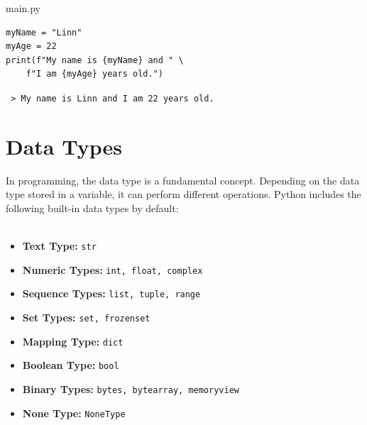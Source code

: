 \documentclass{report}
\begin{document}
\begin{vscode}{main.py}
\begin{lstlisting}[style=vscodeStyle]
myName = "Linn"
myAge = 22
print(f"My name is {myName} and " \
    f"I am {myAge} years old.")
\end{lstlisting}
\end{vscode}

\begin{terminal}
\texttt{\color{terminalFont} > My name is Linn and I am 22 years old.}\\
\end{terminal}

\section{Data Types}
In programming, the data type is a fundamental concept. Depending on the data type stored in a variable, it can perform different operations. Python includes the following built-in data types by default:
\\\\

\begin{tcolorbox}[colback=blue!5!white,colframe=blue!75!black, title=\textbf{Built-in Data Types}]
\begin{itemize}
    \item \textbf{Text Type:} \texttt{str}
    \item \textbf{Numeric Types:} \texttt{int, float, complex}
    \item \textbf{Sequence Types:} \texttt{list, tuple, range}
    \item \textbf{Set Types:} \texttt{set, frozenset}
    \item \textbf{Mapping Type:} \texttt{dict}
    \item \textbf{Boolean Type:} \texttt{bool}
    \item \textbf{Binary Types:} \texttt{bytes, bytearray, memoryview}
    \item \textbf{None Type:} \texttt{NoneType}
\end{itemize}
\end{tcolorbox}
\end{document}
